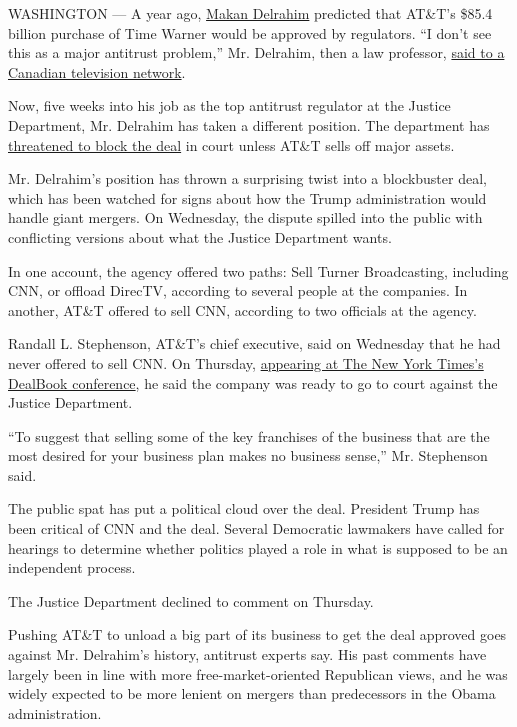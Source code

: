 WASHINGTON --- A year ago, \href{https://www.justice.gov/atr}{Makan
Delrahim} predicted that AT\&T's \$85.4 billion purchase of Time Warner
would be approved by regulators. ``I don't see this as a major antitrust
problem,'' Mr. Delrahim, then a law professor,
\href{http://www.bnn.ca/video/no-big-worries-in-at-t-deal-for-time-warner~978794}{said
to a Canadian television network}.

Now, five weeks into his job as the top antitrust regulator at the
Justice Department, Mr. Delrahim has taken a different position. The
department has
\href{https://www.nytimes3xbfgragh.onion/2017/11/08/business/dealbook/att-time-warner.html}{threatened
to block the deal} in court unless AT\&T sells off major assets.

Mr. Delrahim's position has thrown a surprising twist into a blockbuster
deal, which has been watched for signs about how the Trump
administration would handle giant mergers. On Wednesday, the dispute
spilled into the public with conflicting versions about what the Justice
Department wants.

In one account, the agency offered two paths: Sell Turner Broadcasting,
including CNN, or offload DirecTV, according to several people at the
companies. In another, AT\&T offered to sell CNN, according to two
officials at the agency.

Randall L. Stephenson, AT\&T's chief executive, said on Wednesday that
he had never offered to sell CNN. On Thursday,
\href{https://www.nytimes3xbfgragh.onion/2017/11/09/business/dealbook/att-time-warner-cnn.html}{appearing
at The New York Times's DealBook conference}, he said the company was
ready to go to court against the Justice Department.

``To suggest that selling some of the key franchises of the business
that are the most desired for your business plan makes no business
sense,'' Mr. Stephenson said.

The public spat has put a political cloud over the deal. President Trump
has been critical of CNN and the deal. Several Democratic lawmakers have
called for hearings to determine whether politics played a role in what
is supposed to be an independent process.

The Justice Department declined to comment on Thursday.

Pushing AT\&T to unload a big part of its business to get the deal
approved goes against Mr. Delrahim's history, antitrust experts say. His
past comments have largely been in line with more free-market-oriented
Republican views, and he was widely expected to be more lenient on
mergers than predecessors in the Obama administration.

